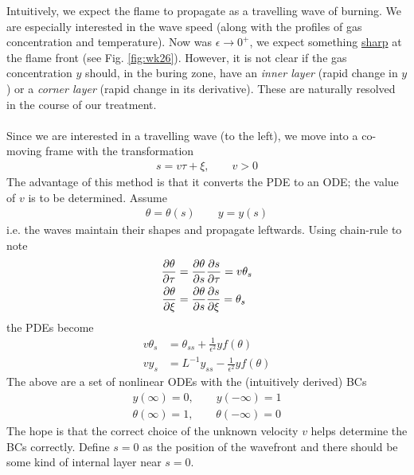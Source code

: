 Intuitively, we expect the flame to propagate as a travelling wave of burning. We are especially interested in the wave speed (along with the profiles of gas concentration and temperature). Now was $\epsilon \rightarrow 0^+$, we expect something \underline{sharp} at the flame front (see Fig. \ref{fig:wk26}). However, it is not clear if the gas concentration $y$ should, in the buring zone, have an \emph{inner layer} (rapid change in $y$) or a \emph{corner layer} (rapid change in its derivative). These are naturally resolved in the course of our treatment. \\\\
Since we are interested in a travelling wave (to the left), we move into a co-moving frame with the transformation
\begin{gather*}
	s = v \tau + \xi, \qquad v >0
\end{gather*}
The advantage of this method is that it converts the PDE to an ODE; the value of $v$ is to be determined. Assume 
\begin{gather*}
	\theta = \theta(s) \qquad y = y(s)
\end{gather*}
i.e. the waves maintain their shapes and propagate leftwards. Using chain-rule to note
\begin{align*}
	\frac{\partial \theta}{\partial \tau} &= \frac{\partial \theta}{\partial s} \frac{\partial s}{\partial \tau } = v \theta_s \\
	\frac{\partial \theta}{\partial \xi} &= \frac{\partial \theta}{\partial s} \frac{\partial s}{\partial \xi } = \theta_s
\end{align*}
the PDEs become
\begin{align*}
	v \theta_s &= \theta_{ss} + \frac{1}{\epsilon^2} y f(\theta) \\
	v y_s &= L^{-1} y_{ss} - \frac{1}{\epsilon^2} y f(\theta)
\end{align*}
The above are a set of nonlinear ODEs with the (intuitively derived) BCs
\begin{align*}
	y(\infty) = 0, \qquad y(-\infty) = 1 \\
	\theta(\infty) = 1, \qquad \theta(-\infty) = 0
\end{align*} 
The hope is that the correct choice of the unknown velocity $v$ helps determine the BCs correctly. Define $s=0$ as the position of the wavefront and there should be some kind of internal layer near $s=0$.\\\\
